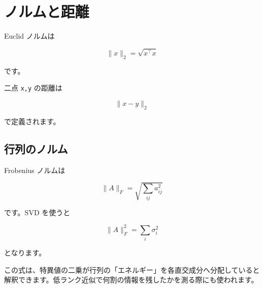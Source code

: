 \documentclass[
  11pt,
  a4paper,
]{ltjsarticle}
\author{}
\date{}
\begin{document}
\hypertarget{ux30ceux30ebux30e0ux3068ux8dddux96e2}{%
\section{ノルムと距離}\label{ux30ceux30ebux30e0ux3068ux8dddux96e2}}

Euclid ノルムは

\[
\|x\|_2=\sqrt{x^\top x}
\]

です。

二点 \texttt{x,y} の距離は

\[
\|x-y\|_2
\]

で定義されます。

\hypertarget{ux884cux5217ux306eux30ceux30ebux30e0}{%
\subsection{行列のノルム}\label{ux884cux5217ux306eux30ceux30ebux30e0}}

Frobenius ノルムは

\[
\|A\|_F=\sqrt{\sum_{ij}a_{ij}^2}
\]

です。SVD を使うと

\[
\|A\|_F^2=\sum_i\sigma_i^2
\]

となります。

この式は、特異値の二乗が行列の「エネルギー」を各直交成分へ分配していると解釈できます。低ランク近似で何割の情報を残したかを測る際にも使われます。
\end{document}
